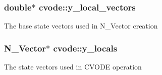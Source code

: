 \subsubsection[{\texorpdfstring{y\+\_\+local\+\_\+vectors}{y_local_vectors}}]{\setlength{\rightskip}{0pt plus 5cm}double$\ast$ cvode\+::y\+\_\+local\+\_\+vectors}\hypertarget{namespacecvode_adae183039534044ead74e1c1a786a36c}{}\label{namespacecvode_adae183039534044ead74e1c1a786a36c}
The base state vectors used in N\+\_\+\+Vector creation 
\subsubsection[{\texorpdfstring{y\+\_\+locals}{y_locals}}]{\setlength{\rightskip}{0pt plus 5cm}N\+\_\+\+Vector$\ast$ cvode\+::y\+\_\+locals}\hypertarget{namespacecvode_a84c47b6a9f2bedf2c5c80429079fc8e3}{}\label{namespacecvode_a84c47b6a9f2bedf2c5c80429079fc8e3}
The state vectors used in C\+V\+O\+DE operation 